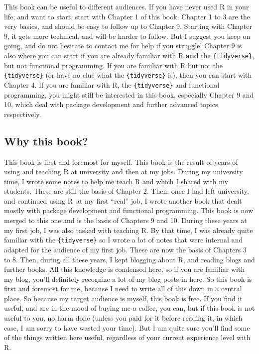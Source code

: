 \documentclass[
]{article}
\begin{document}
This book can be useful to different audiences. If you have never used R in your life, and want
to start, start with Chapter 1 of this book. Chapter 1 to 3 are the very basics, and should be
easy to follow up to Chapter 9.
Starting with Chapter 9, it gets more technical, and will be harder to follow. But I suggest
you keep on going, and do not hesitate to contact me for help if you struggle! Chapter 9
is also where you can start if you are already familiar with R \textbf{and} the \texttt{\{tidyverse\}}, but not
functional programming. If you are familiar with R but not the \texttt{\{tidyverse\}} (or have no clue
what the \texttt{\{tidyverse\}} is), then you can start with Chapter 4. If you are familiar with R, the
\texttt{\{tidyverse\}} and functional programming, you might still be interested in this book, especially
Chapter 9 and 10, which deal with package development and further advanced topics respectively.

\hypertarget{why-this-book}{%
\subsection*{Why this book?}\label{why-this-book}}

This book is first and foremost for myself. This book is the result of years of using and teaching
R at university and then at my jobs. During my university time, I wrote some notes to help me
teach R and which I shared with my students. These are still the basis of Chapter 2. Then, once
I had left university, and continued using R~at my first ``real'' job, I wrote another book that
dealt mostly with package development and functional programming. This book is now merged to this
one and is the basis of Chapters 9 and 10. During these years at my first
job, I was also tasked with teaching R. By that time, I was already quite familiar with the
\texttt{\{tidyverse\}} so I wrote a lot of notes that were internal and adapted for the audience of my
first job. These are now the basis of Chapters 3 to 8.
Then, during all these years, I kept blogging about R, and reading blogs and further books. All
this knowledge is condensed here, so if you are familiar with my blog, you'll definitely recognize
a lot of my blog posts in here. So this book is first and foremost for me, because I need to write
all of this down in a central place. So because my target audience is myself, this book is free. If
you find it useful, and are in the mood of buying me a coffee, you can, but if this book is not
useful to you, no harm done (unless you paid for it before reading it, in which case, I am sorry
to have wasted your time). But I am quite sure you'll find some of the things written here useful,
regardless of your current experience level with R.
\end{document}
